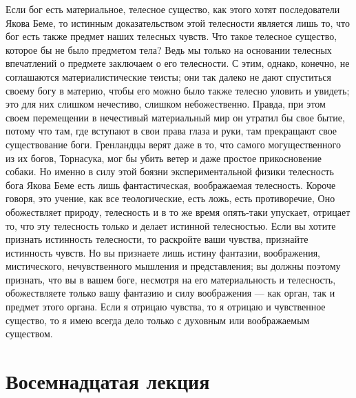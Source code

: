 \documentclass[12pt]{article}
\begin{document}
Если бог есть материальное, телесное существо, как этого хотят последователи Якова Беме, то истинным доказательством этой телесности является лишь то, что бог есть также предмет наших телесных чувств. Что такое телесное существо, которое бы не было предметом тела? Ведь мы только на основании телесных впечатлений о предмете заключаем о его телесности. С этим, однако, конечно, не соглашаются материалистические теисты; они так далеко не дают спуститься своему богу в материю, чтобы его можно было также телесно уловить и увидеть; это для них слишком нечестиво, слишком небожественно. Правда, при этом своем перемещении в нечестивый материальный мир он утратил бы свое бытие, потому что там, где вступают в свои права глаза и руки, там прекращают свое существование боги. Гренландцы верят даже в то, что самого могущественного из их богов, Торнасука, мог бы убить ветер и даже простое прикосновение собаки. Но именно в силу этой боязни экспериментальной физики телесность бога Якова Беме есть лишь фантастическая, воображаемая телесность. Короче говоря, это учение, как все теологические, есть ложь, есть противоречие, Оно обожествляет природу, телесность и в то же время опять-таки упускает, отрицает то, что эту телесность только и делает истинной телесностью. Если вы хотите признать истинность телесности, то раскройте ваши чувства, признайте истинность чувств. Но вы признаете лишь истину фантазии, воображения, мистического, нечувственного мышления и представления; вы должны поэтому признать, что вы в вашем боге, несмотря на его материальность и телесность, обожествляете только вашу фантазию и силу воображения --- как орган, так и предмет этого органа. Если я отрицаю чувства, то я отрицаю и чувственное существо, то я имею всегда дело только с духовным или воображаемым существом. 

\section*{Восемнадцатая лекция}
\end{document}
